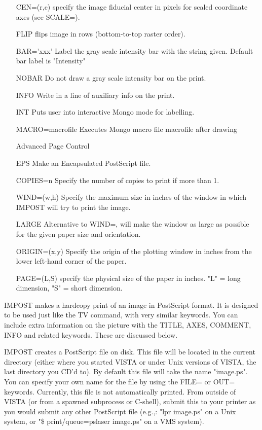 \begin{itemize}
  \item[CEN=(r,c)]{specify the image fiducial center in pixels for
                  scaled coordinate axes (see SCALE=).}
  \item[FLIP ]{flips image in rows (bottom-to-top raster order).}
  \item[BAR='xxx' ]{Label the gray scale intensity bar with the string
                    given.  Default bar label is "Intensity"}
  \item[NOBAR ]{Do not draw a gray scale intensity bar on the print.}
  \item[INFO ]{Write in a line of auxiliary info on the print.}
  \item[INT  ]{Puts user into interactive Mongo mode for labelling.}
  \item[MACRO=macrofile]{ Executes Mongo macro file macrofile after drawing}
  \item[Advanced Page Control\hfill]{}
  \item[EPS]{Make an Encapsulated PostScript file.}
  \item[COPIES=n ]{Specify the number of copies to print if more than 1.}
  \item[WIND=(w,h)]{Specify the maximum size in inches of the window in 
                    which IMPOST will try to print the image.}
  \item[LARGE ]{Alternative to WIND=, will make the window as large as 
                possible for the given paper size and orientation.}
  \item[ORIGIN=(x,y)]{Specify the origin of the plotting window in inches 
                      from the lower left-hand corner of the paper.}
  \item[PAGE=(L,S) ]{specify the physical size of the paper in inches.
                     "L" = long dimension, "S" = short dimension.}
\end{itemize}

IMPOST makes a hardcopy print of an image in PostScript format.  It
is designed to be used just like the TV command, with very similar
keywords. You can include extra information on the picture with the
TITLE, AXES, COMMENT, INFO and related keywords.  These are discussed
below.
 
IMPOST creates a PostScript file on disk.  This file will be located in the
current directory (either where you started VISTA or under Unix versions of
VISTA, the last directory you CD'd to).  By default this file will take the
name "image.ps".  You can specify your own name for the file by using the
FILE= or OUT= keywords.  Currently, this file is not automatically printed.
From outside of VISTA (or from a spawned subprocess or C-shell), submit
this to your printer as you would submit any other PostScript file (e.g.,:
"lpr image.ps" on a Unix system, or "\$ print/queue=pslaser image.ps" on a
VMS system).

